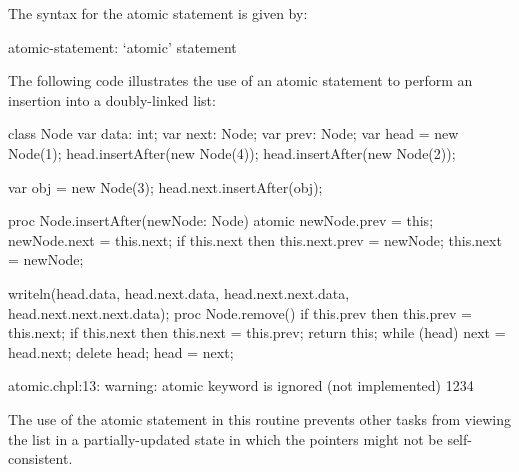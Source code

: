 The syntax for the atomic statement is given by:
\begin{syntax}
atomic-statement:
  `atomic' statement
\end{syntax}

\begin{example}
The following code illustrates the use of an atomic statement
to perform an insertion into a doubly-linked list:

\begin{chapelpre}
class Node {
  var data: int;
  var next: Node;
  var prev: Node;
}
var head = new Node(1);
head.insertAfter(new Node(4));
head.insertAfter(new Node(2));

var obj = new Node(3);
head.next.insertAfter(obj);
\end{chapelpre}
\begin{chapel}
proc Node.insertAfter(newNode: Node) {
  atomic {
    newNode.prev = this;
    newNode.next = this.next;
    if this.next then this.next.prev = newNode;
    this.next = newNode;
  }
}
\end{chapel}
\begin{chapelpost}
writeln(head.data, head.next.data, head.next.next.data, head.next.next.next.data);
proc Node.remove() {
  if this.prev then this.prev = this.next;
  if this.next then this.next = this.prev;
  return this;
}
while (head) {
  next = head.next;
  delete head;
  head = next;
}
\end{chapelpost}
\begin{chapeloutput}
atomic.chpl:13: warning: atomic keyword is ignored (not implemented)
1234
\end{chapeloutput}
The use of the atomic statement in this routine prevents other tasks
from viewing the list in a partially-updated state in which the
pointers might not be self-consistent.
\end{example}
